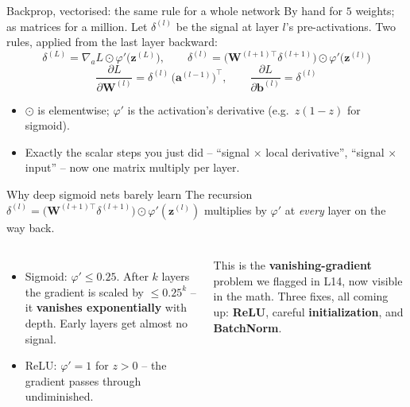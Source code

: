 \documentclass[aspectratio=169]{beamer}
\begin{document}
\begin{frame}{Backprop, vectorised: the same rule for a whole network}
  By hand for $5$ weights; as matrices for a million. Let $\delta^{(l)}$ be the signal at
  layer $l$'s pre-activations. Two rules, applied from the last layer backward:
  \vfill
  \[
    \delta^{(L)} = \nabla_{\!a} L \odot \varphi'\!\big(\mathbf{z}^{(L)}\big),
    \qquad
    \delta^{(l)} = \big(\mathbf{W}^{(l+1)\top}\delta^{(l+1)}\big) \odot \varphi'\!\big(\mathbf{z}^{(l)}\big)
  \]
  \[
    \frac{\partial L}{\partial \mathbf{W}^{(l)}} = \delta^{(l)}\,\big(\mathbf{a}^{(l-1)}\big)^{\!\top},
    \qquad
    \frac{\partial L}{\partial \mathbf{b}^{(l)}} = \delta^{(l)}
  \]
  \vfill
  \begin{itemize}\small
    \item $\odot$ is elementwise; $\varphi'$ is the activation's derivative (e.g.\ $z(1-z)$ for
      sigmoid).
    \item Exactly the scalar steps you just did -- ``signal $\times$ local derivative'',
      ``signal $\times$ input'' -- now one matrix multiply per layer.
  \end{itemize}
\end{frame}

\begin{frame}{Why deep sigmoid nets barely learn}
  The recursion $\delta^{(l)} = \big(\mathbf{W}^{(l+1)\top}\delta^{(l+1)}\big)\odot
  \varphi'(\mathbf{z}^{(l)})$ multiplies by $\varphi'$ at \emph{every} layer on the way back.
  \vfill
  \begin{columns}[T]
    \begin{itemize}\small
      \item Sigmoid: $\varphi' \le 0.25$. After $k$ layers the gradient is scaled by
        $\le 0.25^{k}$ -- it \textbf{vanishes exponentially} with depth. Early layers get
        almost no signal.
      \item ReLU: $\varphi' = 1$ for $z>0$ -- the gradient passes through undiminished.
    \end{itemize}
    \vskip 4pt
    This is the \textbf{vanishing-gradient} problem we flagged in L14, now visible in the math.
    Three fixes, all coming up: \textbf{ReLU}, careful \textbf{initialization}, and
    \textbf{BatchNorm}.
  \end{columns}
\end{frame}
\end{document}

